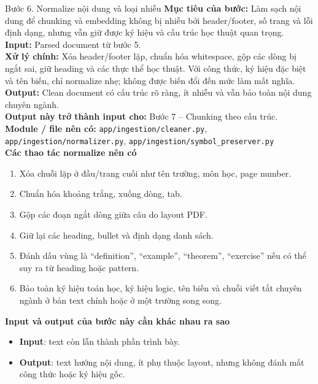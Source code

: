 \documentclass[12pt,a4paper]{article}
\newcommand{\stepgoal}[1]{\textbf{Mục tiêu của bước:} #1\\}
\newcommand{\stepinput}[1]{\textbf{Input:} #1\\}
\newcommand{\stepprocess}[1]{\textbf{Xử lý chính:} #1\\}
\newcommand{\stepoutput}[1]{\textbf{Output:} #1\\}
\newcommand{\stepnext}[1]{\textbf{Output này trở thành input cho:} #1\\}
\newcommand{\stepmodules}[1]{\textbf{Module / file nên có:} #1\\}
\begin{document}
\begin{stepbox}{Bước 6. Normalize nội dung và loại nhiễu}
\stepgoal{Làm sạch nội dung để chunking và embedding không bị nhiễu bởi header/footer, số trang và lỗi định dạng, nhưng vẫn giữ được ký hiệu và cấu trúc học thuật quan trọng.}
\stepinput{Parsed document từ bước 5.}
\stepprocess{Xóa header/footer lặp, chuẩn hóa whitespace, gộp các dòng bị ngắt sai, giữ heading và các thực thể học thuật. Với công thức, ký hiệu đặc biệt và tên biến, chỉ normalize nhẹ; không được biến đổi đến mức làm mất nghĩa.}
\stepoutput{Clean document có cấu trúc rõ ràng, ít nhiễu và vẫn bảo toàn nội dung chuyên ngành.}
\stepnext{Bước 7 -- Chunking theo cấu trúc.}
\stepmodules{\texttt{app/ingestion/cleaner.py}, \texttt{app/ingestion/normalizer.py}, \texttt{app/ingestion/symbol\_preserver.py}}

\textbf{Các thao tác normalize nên có}
\begin{enumerate}[label=\arabic*.]
    \item Xóa chuỗi lặp ở đầu/trang cuối như tên trường, môn học, page number.
    \item Chuẩn hóa khoảng trắng, xuống dòng, tab.
    \item Gộp các đoạn ngắt dòng giữa câu do layout PDF.
    \item Giữ lại các heading, bullet và định dạng danh sách.
    \item Đánh dấu vùng là ``definition'', ``example'', ``theorem'', ``exercise'' nếu có thể suy ra từ heading hoặc pattern.
    \item Bảo toàn ký hiệu toán học, ký hiệu logic, tên biến và chuỗi viết tắt chuyên ngành ở bản text chính hoặc ở một trường song song.
\end{enumerate}

\textbf{Input và output của bước này cần khác nhau ra sao}
\begin{itemize}
    \item \textbf{Input}: text còn lẫn thành phần trình bày.
    \item \textbf{Output}: text hướng nội dung, ít phụ thuộc layout, nhưng không đánh mất công thức hoặc ký hiệu gốc.
\end{itemize}
\end{stepbox}
\end{document}
